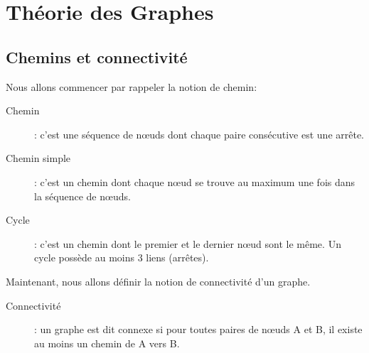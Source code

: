 \section{Théorie des Graphes}


\subsection{Chemins et connectivité}
Nous allons commencer par rappeler la notion de chemin:
	\begin{description}
	\item[Chemin]: c'est une séquence de n\oe uds dont chaque paire consécutive est une arrête.
    \item[Chemin simple]: c'est un chemin dont chaque n\oe ud se trouve au maximum une fois dans la séquence de n\oe uds.
    \item[Cycle]: c'est un chemin dont le premier et le dernier n\oe ud sont le même. Un cycle possède au moins 3 liens (arrêtes).\\
	\end{description}

Maintenant, nous allons définir la notion de connectivité d'un graphe.
	\begin{description}
    \item[Connectivité]: un graphe est dit connexe si pour toutes paires de n\oe uds A et B, il existe au moins un chemin de A vers B.\\
	\end{description}

